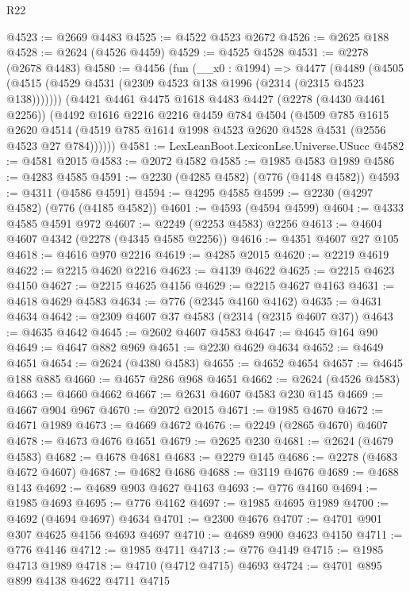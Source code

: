 \begin{lexlean}{R22}
\begin{coremodule}
@4523 := @2669 @4483
@4525 := @4522 @4523 @2672
@4526 := @2625 @188
@4528 := @2624 (@4526 @4459)
@4529 := @4525 @4528
@4531 := @2278 (@2678 @4483)
@4580 := @4456
    (fun (__x0 : @1994) =>
    @4477
      (@4489 (@4505 (@4515 (@4529 @4531 (@2309 @4523 @138 @1996 (@2314 (@2315 @4523 @138)))))))
      (@4421
        @4461
        @4475
        @1618
        @4483
        @4427
        (@2278 (@4430 @4461 @2256))
        (@4492
          @1616
          @2216
          @2216
          @4459
          @784
          @4504
          (@4509
            @785
            @1615
            @2620
            @4514
            (@4519 @785 @1614 @1998 @4523 @2620 @4528 @4531 (@2556 @4523 @27 @784))))))
@4581 := LexLeanBoot.LexiconLse.Universe.USucc
@4582 := @4581 @2015
@4583 := @2072 @4582
@4585 := @1985 @4583 @1989
@4586 := @4283 @4585
@4591 := @2230 (@4285 @4582) (@776 (@4148 @4582))
@4593 := @4311 (@4586 @4591)
@4594 := @4295 @4585
@4599 := @2230 (@4297 @4582) (@776 (@4185 @4582))
@4601 := @4593 (@4594 @4599)
@4604 := @4333 @4585 @4591 @972
@4607 := @2249 (@2253 @4583) @2256
@4613 := @4604 @4607 @4342 (@2278 (@4345 @4585 @2256))
@4616 := @4351 @4607 @27 @105
@4618 := @4616 @970 @2216
@4619 := @4285 @2015
@4620 := @2219 @4619
@4622 := @2215 @4620 @2216
@4623 := @4139 @4622
@4625 := @2215 @4623 @4150
@4627 := @2215 @4625 @4156
@4629 := @2215 @4627 @4163
@4631 := @4618 @4629 @4583
@4634 := @776 (@2345 @4160 @4162)
@4635 := @4631 @4634
@4642 := @2309 @4607 @37 @4583 (@2314 (@2315 @4607 @37))
@4643 := @4635 @4642
@4645 := @2602 @4607 @4583
@4647 := @4645 @164 @90
@4649 := @4647 @882 @969
@4651 := @2230 @4629 @4634
@4652 := @4649 @4651
@4654 := @2624 (@4380 @4583)
@4655 := @4652 @4654
@4657 := @4645 @188 @885
@4660 := @4657 @286 @968 @4651
@4662 := @2624 (@4526 @4583)
@4663 := @4660 @4662
@4667 := @2631 @4607 @4583 @230 @145
@4669 := @4667 @904 @967
@4670 := @2072 @2015
@4671 := @1985 @4670
@4672 := @4671 @1989
@4673 := @4669 @4672
@4676 := @2249 (@2865 @4670) @4607
@4678 := @4673 @4676 @4651
@4679 := @2625 @230
@4681 := @2624 (@4679 @4583)
@4682 := @4678 @4681
@4683 := @2279 @145
@4686 := @2278 (@4683 @4672 @4607)
@4687 := @4682 @4686
@4688 := @3119 @4676
@4689 := @4688 @143
@4692 := @4689 @903 @4627 @4163
@4693 := @776 @4160
@4694 := @1985 @4693
@4695 := @776 @4162
@4697 := @1985 @4695 @1989
@4700 := @4692 (@4694 @4697) @4634
@4701 := @2300 @4676
@4707 := @4701 @901 @307 @4625 @4156 @4693 @4697
@4710 := @4689 @900 @4623 @4150
@4711 := @776 @4146
@4712 := @1985 @4711
@4713 := @776 @4149
@4715 := @1985 @4713 @1989
@4718 := @4710 (@4712 @4715) @4693
@4724 := @4701 @895 @899 @4138 @4622 @4711 @4715

\end{coremodule}
\end{lexlean}
